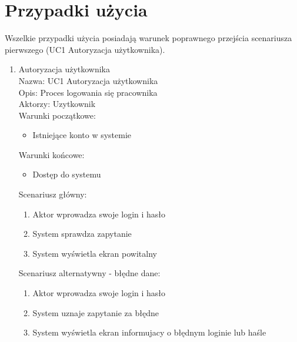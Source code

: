 \section{Przypadki użycia}
Wszelkie przypadki użycia posiadają warunek poprawnego przejścia scenariusza pierwszego (UC1 Autoryzacja użytkownika).
\begin{enumerate}
\item Autoryzacja użytkownika \\
Nazwa: UC1 Autoryzacja użytkownika \\
Opis: Proces logowania się pracownika \\
Aktorzy: Uzytkownik \\
Warunki początkowe: 
\begin{itemize}
\item Istniejące konto w systemie 
\end{itemize}
Warunki końcowe: 
\begin{itemize}
\item Dostęp do systemu 
\end{itemize}
Scenariusz główny:
\begin{enumerate}
\item Aktor wprowadza swoje login i hasło
\item System sprawdza zapytanie
\item System wyświetla ekran powitalny
\end{enumerate}
Scenariusz alternatywny - błędne dane: 
\begin{enumerate}
\item Aktor wprowadza swoje login i hasło
\item System uznaje zapytanie za błędne
\item System wyświetla ekran informujacy o błędnym loginie lub haśle
\end{enumerate}


\end{enumerate}
